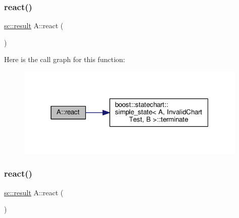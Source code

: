 \subsubsection{\texorpdfstring{react()}{react()}\hspace{0.1cm}{\footnotesize\ttfamily [9/11]}}
{\footnotesize\ttfamily \mbox{\hyperlink{namespaceboost_1_1statechart_abe807f6598b614d6d87bb951ecd92331}{sc\+::result}} A\+::react (\begin{DoxyParamCaption}\item[{const \mbox{\hyperlink{struct_ev_terminate}{Ev\+Terminate}} \&}]{ }\end{DoxyParamCaption})\hspace{0.3cm}{\ttfamily [inline]}}

Here is the call graph for this function\+:
\nopagebreak
\begin{figure}[H]
\begin{center}
\leavevmode
\includegraphics[width=313pt]{struct_a_a43a91cc21bb007d57f7cacb94c9da395_cgraph}
\end{center}
\end{figure}
\mbox{\label{struct_a_a93cff2d52bb90cd3d97117abfc5ed3a6}} 
\subsubsection{\texorpdfstring{react()}{react()}\hspace{0.1cm}{\footnotesize\ttfamily [10/11]}}
{\footnotesize\ttfamily \mbox{\hyperlink{namespaceboost_1_1statechart_abe807f6598b614d6d87bb951ecd92331}{sc\+::result}} A\+::react (\begin{DoxyParamCaption}\item[{const \mbox{\hyperlink{struct_ev_transit}{Ev\+Transit}} \&}]{ }\end{DoxyParamCaption})\hspace{0.3cm}{\ttfamily [inline]}}

\mbox{\label{struct_a_a22e1cf6871b994db83aec743fbf6f5d0}} 
